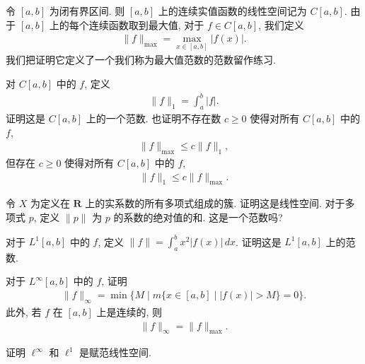 \documentclass[../../main.tex]{subfiles}
\begin{document}
\begin{example}\label{example:ch07-Cab范数}
令 $[a,b]$ 为闭有界区间. 则 $[a,b]$ 上的连续实值函数的线性空间记为 $C[a,b]$. 由于 $[a,b]$ 上的每个连续函数取到最大值, 对于 $f\in C[a,b]$, 我们定义
\begin{align*}
\|f\|_{\max}=\max_{x\in[a,b]}|f(x)|.
\end{align*}
我们把证明它定义了一个我们称为最大值范数的范数留作练习.
\end{example}

\begin{exercise}\label{exercise:ch07-01}
对 $C[a,b]$ 中的 $f$, 定义
\begin{align*}
\|f\|_{1}=\int_{a}^{b}|f|.
\end{align*}
证明这是 $C[a,b]$ 上的一个范数. 也证明不存在数 $c\geqslant 0$ 使得对所有 $C[a,b]$ 中的 $f$,
\begin{align*}
\|f\|_{\max}\leqslant c\|f\|_{1},
\end{align*}
但存在 $c\geqslant 0$ 使得对所有 $C[a,b]$ 中的 $f$,
\begin{align*}
\|f\|_{1}\leqslant c\|f\|_{\max}.
\end{align*}
\end{exercise}

\begin{exercise}\label{exercise:ch07-02}
令 $X$ 为定义在 $\mathbf{R}$ 上的实系数的所有多项式组成的簇. 证明这是线性空间. 对于多项式 $p$, 定义 $\|p\|$ 为 $p$ 的系数的绝对值的和. 这是一个范数吗?
\end{exercise}

\begin{exercise}\label{exercise:ch07-03}
对于 $L^{1}[a,b]$ 中的 $f$, 定义 $\|f\|=\int_{a}^{b}x^{2}|f(x)|\,dx$. 证明这是 $L^{1}[a,b]$ 上的范数.
\end{exercise}

\begin{exercise}\label{exercise:ch07-04}
对于 $L^{\infty}[a,b]$ 中的 $f$, 证明
\begin{align*}
\|f\|_{\infty}=\min\{M\mid m\{x\in[a,b]\mid|f(x)|>M\}=0\}.
\end{align*}
此外, 若 $f$ 在 $[a,b]$ 上是连续的, 则
\begin{align*}
\|f\|_{\infty}=\|f\|_{\max}.
\end{align*}
\end{exercise}

\begin{exercise}\label{exercise:ch07-05}
证明 $\ell^{\infty}$ 和 $\ell^{1}$ 是赋范线性空间.
\end{exercise}
\end{document}
